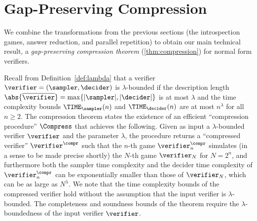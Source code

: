 \section{Gap-Preserving Compression}
\label{sec:compression}

We combine the transformations from the previous sections (the introspection
games, answer reduction, and parallel repetition) to obtain our
main technical result, a \emph{gap-preserving compression theorem}
(\cref{thm:compression}) for normal form verifiers.

Recall from Definition~\ref{def:lambda} that a verifier $\verifier = (\sampler,
\decider)$ is $\lambda$-bounded if the description length $\abs{\overline{\verifier}}= \max \{ |\sampler|,|\decider| \}$ is at most
$\lambda$ and the time complexity bounds $\TIME_\sampler(n)$ and
$\TIME_\decider(n)$ are at most $n^\lambda$ for all $n \ge 2$.
The compression theorem states the existence of an efficient ``compression
procedure'' $\Compress$ that achieves the following.
Given as input a $\lambda$-bounded verifier $\verifier$ and the parameter
$\lambda$, the procedure returns a ``compressed verifier'' $\verifier^\compr$
such that the $n$-th game $\verifier^\compr_n$ simulates (in a sense to be made precise shortly) the $N$-th game
$\verifier_N$ for $N = 2^n$, and furthermore both the sampler time complexity
and the decider time complexity of $\verifier^\compr_n$ can be exponentially
smaller than those of $\verifier_N$, which can be as large as $N^\lambda$.
We note that the time complexity bounds of the compressed verifier hold without
the assumption that the input verifier is $\lambda$-bounded.
The completeness and soundness bounds of the theorem require the
$\lambda$-boundedness of the input verifier $\verifier$.

